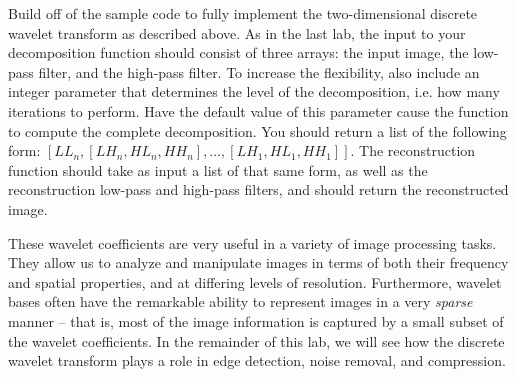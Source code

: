 \begin{problem}
Build off of the sample code to fully implement the two-dimensional discrete 
wavelet transform as described above.
As in the last lab, the input to your decomposition function should consist of
three arrays: the input image, the low-pass filter, and the high-pass filter.
To increase the flexibility, also include an integer parameter that determines
the level of the decomposition, i.e. how many iterations to perform. Have the
default value of this parameter cause the function to compute the complete
decomposition.
You should return a list of the following form: $[LL_n,[LH_n,HL_n,HH_n],\ldots
,[LH_1,HL_1,HH_1]]$. The reconstruction function should take as input a list
of that same form, as well as the reconstruction low-pass and high-pass filters,
and should return the reconstructed image.
\end{problem}

These wavelet coefficients are very useful in a variety of image processing
tasks. They allow us to analyze and manipulate images in terms of both their
frequency and spatial properties, and at differing levels of resolution.
Furthermore, wavelet bases often have the remarkable ability to represent
images in a very \textit{sparse} manner -- that is, most of the image
information is captured by a small subset of the wavelet coefficients.
In the remainder of this lab, we will see how the discrete wavelet transform
plays a role in edge detection, noise removal, and compression.

